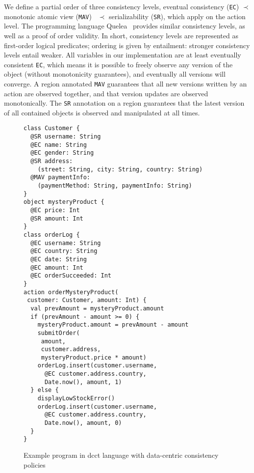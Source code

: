 \documentclass[preprint,numbers]{sigplanconf}
\begin{document}
We define a partial order of three consistency levels, eventual
consistency (\texttt{EC}) $\prec$ monotonic atomic view (\texttt{MAV})~\cite{bailis2013highly}  $\prec$
serializability (\texttt{SR}), which apply on the action level. The programming language Quelea~\cite{sivaramakrishnan2015declarative} provides similar
consistency levels, as well as a proof of order validity. In short, consistency
levels are represented as first-order logical predicates; ordering is given
by entailment: stronger consistency levels entail weaker.
All variables in our implementation are at least eventually consistent
\texttt{EC}, which means it
is possible to freely observe any version of the object (without monotonicity
guarantees), and
eventually all versions will converge. A region annotated \texttt{MAV}
guarantees that all new versions written by an
action are observed together, and that version updates are observed
monotonically. The \texttt{SR} annotation on a
region guarantees that the latest version of all
contained objects is observed and manipulated at all times. 

\begin{figure}[t!] 
\begin{lstlisting}[basicstyle=\small\ttfamily]
class Customer {
  @SR username: String
  @EC name: String
  @EC gender: String
  @SR address: 
    (street: String, city: String, country: String) 
  @MAV paymentInfo:
    (paymentMethod: String, paymentInfo: String)
}
object mysteryProduct {
  @EC price: Int
  @SR amount: Int
}
class orderLog {
  @EC username: String
  @EC country: String
  @EC date: String
  @EC amount: Int
  @EC orderSucceeded: Int
}
action orderMysteryProduct(
 customer: Customer, amount: Int) {
  val prevAmount = mysteryProduct.amount
  if (prevAmount - amount >= 0) {
    mysteryProduct.amount = prevAmount - amount
    submitOrder(
     amount, 
     customer.address, 
     mysteryProduct.price * amount)
    orderLog.insert(customer.username, 
      @EC customer.address.country, 
      Date.now(), amount, 1)
  } else {
    displayLowStockError() 
    orderLog.insert(customer.username, 
      @EC customer.address.country, 
      Date.now(), amount, 0)
  }
}
\end{lstlisting}
\caption{Example program in dcct language with data-centric consistency policies}
\label{fig:example}
\end{figure}
\end{document}

